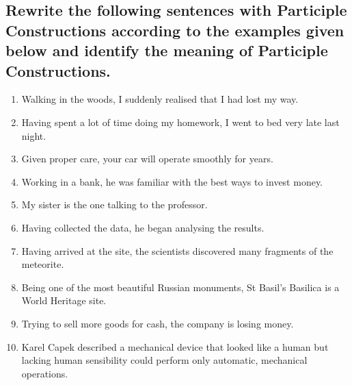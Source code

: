 \subsection*{Rewrite the following sentences with Participle Constructions according to the examples given below and identify the meaning of Participle Constructions.}
\begin{enumerate}
      \item Walking in the woods, I suddenly realised that I had lost my way.
      \item Having spent a lot of time doing my homework, I went to bed very late last night.
      \item Given proper care, your car will operate smoothly for years.
      \item Working in a bank, he was familiar with the best ways to invest money.
      \item My sister is the one talking to the professor.
      \item Having collected the data, he began analysing the results.
      \item Having arrived at the site, the scientists discovered many fragments of the meteorite.
      \item Being one of the most beautiful Russian monuments, St Basil’s Basilica is a World Heritage site.
      \item Trying to sell more goods for cash, the company is losing money.
      \item Karel Capek described a mechanical device that looked like a human but lacking human sensibility could perform only automatic, mechanical operations.
\end{enumerate}

